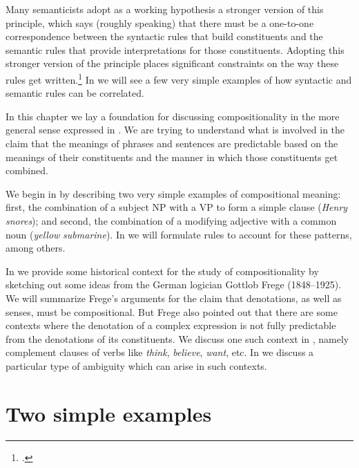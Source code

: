 Many semanticists adopt as a working hypothesis a stronger version of this principle, which says (roughly speaking) that there must be a one-to-one correspondence between the syntactic rules that build constituents and the semantic rules that provide interpretations for those constituents. Adopting this stronger version of the principle places significant constraints on the way these rules get written.\footnote{\citet[322]{Partee1995}.} In  we will see a few very simple examples of how syntactic and semantic rules can be correlated.



In this chapter we lay a foundation for discussing compositionality in the more general sense expressed in . We are trying to understand what is involved in the claim that the meanings of phrases and sentences are predictable based on the meanings of their constituents and the manner in which those constituents get combined.



We begin in  by describing two very simple examples of compositional meaning: first, the combination of a subject NP with a VP to form a simple clause (\textit{Henry snores}); and second, the combination of a modifying adjective with a common noun (\textit{yellow} \textit{submarine}). In  we will formulate rules to account for these patterns, among others.



In  we provide some historical context for the study of compositionality by sketching out some ideas from the German logician Gottlob Frege (1848–1925). We will summarize Frege’s arguments for the claim that denotations, as well as senses, must be compositional. But Frege also pointed out that there are some contexts where the denotation of a complex expression is not fully predictable from the denotations of its constituents. We discuss one such context in , namely complement clauses of verbs like \textit{think}, \textit{believe}, \textit{want}, etc. In  we discuss a particular type of ambiguity which can arise in such contexts.


\section{Two simple examples}\label{sec:} %

